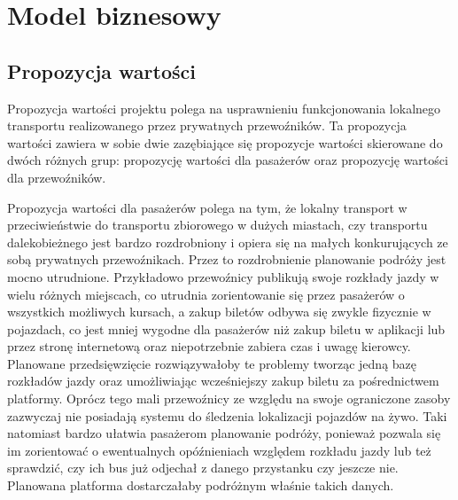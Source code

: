 \chapter{Model biznesowy}
\label{chap:drugi}



\section{Propozycja wartości}

Propozycja wartości projektu polega na usprawnieniu funkcjonowania lokalnego transportu realizowanego przez prywatnych przewoźników. Ta propozycja wartości zawiera w sobie dwie zazębiające się propozycje wartości skierowane do dwóch różnych grup: propozycję wartości dla pasażerów oraz propozycję wartości dla przewoźników.

Propozycja wartości dla pasażerów polega na tym, że lokalny transport w przeciwieństwie do transportu zbiorowego w dużych miastach, czy transportu dalekobieżnego jest bardzo rozdrobniony i opiera się na małych konkurujących ze sobą prywatnych przewoźnikach. Przez to rozdrobnienie planowanie podróży jest mocno utrudnione. Przykładowo przewoźnicy publikują swoje rozkłady jazdy w wielu różnych miejscach, co utrudnia zorientowanie się przez pasażerów o wszystkich możliwych kursach, a zakup biletów odbywa się zwykle fizycznie w pojazdach, co jest mniej wygodne dla pasażerów niż zakup biletu w aplikacji lub przez stronę internetową oraz niepotrzebnie zabiera czas i uwagę kierowcy. Planowane przedsięwzięcie rozwiązywałoby te problemy tworząc jedną bazę rozkładów jazdy oraz umożliwiając wcześniejszy zakup biletu za pośrednictwem platformy. Oprócz tego mali przewoźnicy ze względu na swoje ograniczone zasoby zazwyczaj nie posiadają systemu do śledzenia lokalizacji pojazdów na żywo. Taki natomiast bardzo ułatwia pasażerom planowanie podróży, ponieważ pozwala się im zorientować o ewentualnych opóźnieniach względem rozkładu jazdy lub też sprawdzić, czy ich bus już odjechał z danego przystanku czy jeszcze nie. Planowana platforma dostarczałaby podróżnym właśnie takich danych.


